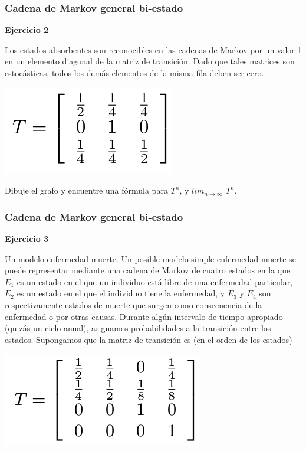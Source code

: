 \documentclass[spanish]{beamer}
\begin{document}

\begin{frame}
\frametitle{Cadena de Markov general bi-estado}
\textbf{Ejercicio 2}


Los estados absorbentes son reconocibles en las cadenas de Markov por un valor 1 en un elemento diagonal de la matriz de transición. Dado que tales matrices son estocásticas, todos los demás elementos de la misma fila deben ser cero.

\begin{center}
\includegraphics[scale=0.3]{im26}
\end{center}
Dibuje el grafo y encuentre una fórmula para $T^{n}$, y $lim_{n\rightarrow \infty}$ $T^{n}$.
\end{frame}

\begin{frame}
\frametitle{Cadena de Markov general bi-estado}
\textbf{Ejercicio 3}


Un modelo enfermedad-muerte. Un posible modelo simple enfermedad-muerte se puede representar mediante una cadena de Markov de cuatro estados en la que $E_{1}$ es un estado en el que un individuo está libre de una enfermedad particular, $E_{2}$ es un estado en el que el individuo tiene la enfermedad, y $E_3$ y $E_4$ son
respectivamente estados de muerte que surgen como consecuencia de la enfermedad o por otras causas. Durante algún intervalo de tiempo apropiado (quizás un ciclo anual), asignamos probabilidades a la transición entre los estados. Supongamos que la matriz de transición es (en el orden de los estados)

\begin{center}
\includegraphics[scale=0.3]{im27}
\end{center}

\end{frame}
\end{document}
